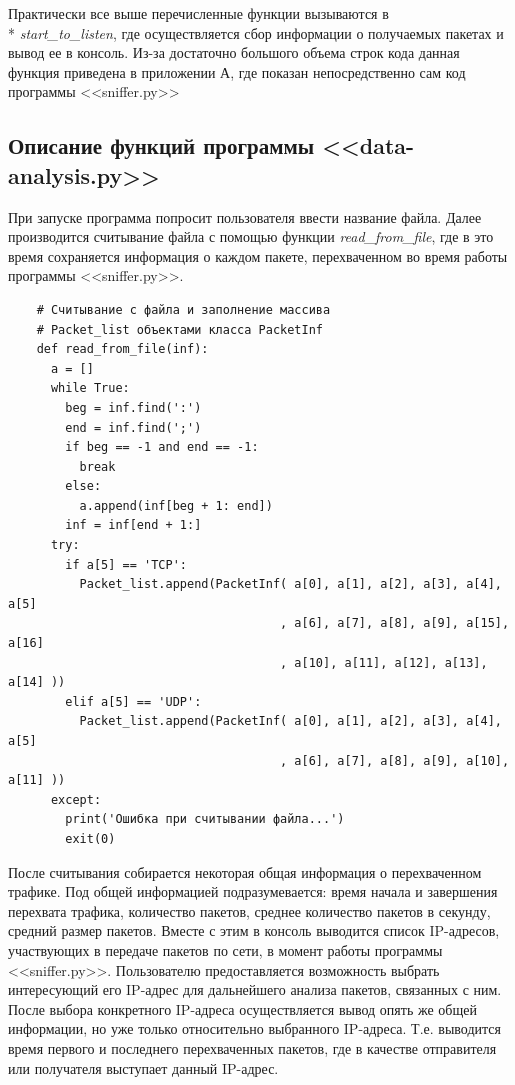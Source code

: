 \documentclass[bachelor, och, coursework]{SCWorks}
\begin{document}
    Практически все выше перечисленные функции вызываются в \\* \textit{start\_to\_listen}, где осуществляется сбор информации
    о получаемых пакетах и вывод ее в консоль. Из-за достаточно большого объема строк кода данная функция приведена в приложении А, где
    показан непосредственно сам код программы <<sniffer.py>> 

  \subsection{Описание функций программы <<data-analysis.py>>}

  При запуске программа попросит пользователя ввести название файла. Далее производится считывание файла с помощью функции \textit{read\_from\_file},
  где в это время сохраняется информация о каждом пакете, перехваченном во время работы программы <<sniffer.py>>.

  \begin{verbatim}
    # Считывание с файла и заполнение массива
    # Packet_list объектами класса PacketInf
    def read_from_file(inf):
      a = []
      while True:
        beg = inf.find(':')
        end = inf.find(';')
        if beg == -1 and end == -1:
          break
        else:
          a.append(inf[beg + 1: end])
        inf = inf[end + 1:]
      try:
        if a[5] == 'TCP':
          Packet_list.append(PacketInf( a[0], a[1], a[2], a[3], a[4], a[5]
                                      , a[6], a[7], a[8], a[9], a[15], a[16]
                                      , a[10], a[11], a[12], a[13], a[14] ))
        elif a[5] == 'UDP':
          Packet_list.append(PacketInf( a[0], a[1], a[2], a[3], a[4], a[5]
                                      , a[6], a[7], a[8], a[9], a[10], a[11] ))
      except:
        print('Ошибка при считывании файла...')
        exit(0)
  \end{verbatim}

  После считывания собирается некоторая общая информация о перехваченном трафике. Под общей информацией подразумевается: время начала и завершения
  перехвата трафика, количество пакетов, среднее количество пакетов в секунду, средний размер пакетов. Вместе с этим в консоль выводится список 
  IP-адресов, участвующих в передаче пакетов по сети, в момент работы программы <<sniffer.py>>. Пользователю предоставляется возможность выбрать
  интересующий его IP-адрес для дальнейшего анализа пакетов, связанных с ним. После выбора конкретного IP-адреса осуществляется вывод опять же общей
  информации, но уже только относительно выбранного IP-адреса. Т.е. выводится время первого и последнего перехваченных пакетов, где в качестве отправителя
  или получателя выступает данный IP-адрес. 
  
\end{document}
